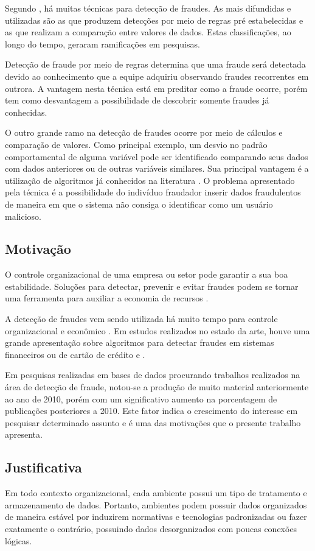 \documentclass[smallextended]{svjour3}       %
\begin{document}
Segundo \cite{Fawcett1997}, há muitas técnicas para detecção de fraudes. As mais difundidas e utilizadas são as que produzem detecções por meio de regras pré estabelecidas e as que realizam a comparação entre valores de dados. Estas classificações, ao longo do tempo, geraram ramificações em pesquisas.

Detecção de fraude por meio de regras determina que uma fraude será detectada devido ao conhecimento que a equipe adquiriu observando fraudes recorrentes em outrora. A vantagem nesta técnica está em preditar como a fraude ocorre, porém tem como desvantagem a possibilidade de descobrir somente fraudes já conhecidas.

O outro grande ramo na detecção de fraudes ocorre por meio de cálculos e comparação de valores. Como principal exemplo, um desvio no padrão comportamental de alguma variável pode ser identificado comparando seus dados com dados anteriores ou de outras variáveis similares. Sua principal vantagem é a utilização de algoritmos já conhecidos na literatura \citep{Fawcett1997}. O problema apresentado pela técnica é a possibilidade do indivíduo fraudador inserir dados fraudulentos de maneira em que o sistema não consiga o identificar como um usuário malicioso.

\subsection{Motivação}
O controle organizacional de uma empresa ou setor pode garantir a sua boa estabilidade. Soluções para detectar, prevenir e evitar fraudes podem se tornar uma ferramenta para auxiliar a economia de recursos \citep{809570}. 

A detecção de fraudes vem sendo utilizada há muito tempo para controle organizacional e econômico \citep{Seyedhossein2010}. Em estudos realizados no estado da arte, houve uma grande apresentação sobre algoritmos para detectar fraudes em sistemas financeiros ou de cartão de crédito \citep{Chandola:2009:ADS:1541880.1541882} e \citep{Abdallah201690}.

Em pesquisas realizadas em bases de dados procurando trabalhos realizados na área de detecção de fraude, notou-se a produção de muito material anteriormente ao ano de 2010, porém com um significativo aumento na porcentagem de publicações posteriores a 2010. Este fator indica o crescimento do interesse em pesquisar determinado assunto e é uma das motivações que o presente trabalho apresenta.

\subsection{Justificativa}
Em todo contexto organizacional, cada ambiente possui um tipo de tratamento e armazenamento de dados. Portanto, ambientes podem possuir dados organizados de maneira estável por induzirem normativas e tecnologias padronizadas ou fazer exatamente o contrário, possuindo dados desorganizados com poucas conexões lógicas.
\end{document}
